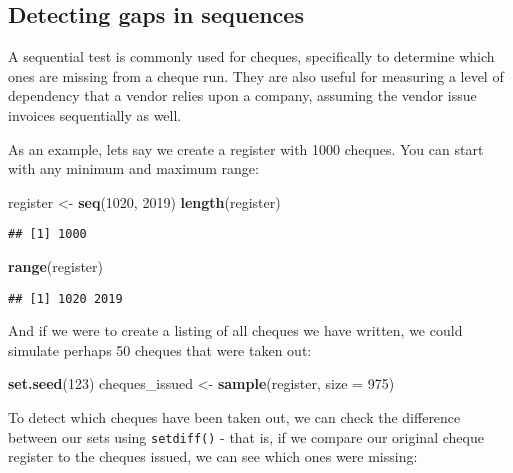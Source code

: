 \documentclass[
]{book}
\newenvironment{Shaded}{\begin{snugshade}}{\end{snugshade}}
\newcommand{\DataTypeTok}[1]{\textcolor[rgb]{0.13,0.29,0.53}{#1}}
\newcommand{\DecValTok}[1]{\textcolor[rgb]{0.00,0.00,0.81}{#1}}
\newcommand{\KeywordTok}[1]{\textcolor[rgb]{0.13,0.29,0.53}{\textbf{#1}}}
\newcommand{\NormalTok}[1]{#1}
\newcommand{\StringTok}[1]{\textcolor[rgb]{0.31,0.60,0.02}{#1}}
\begin{document}
\hypertarget{detecting-gaps-in-sequences}{%
\subsection{Detecting gaps in sequences}\label{detecting-gaps-in-sequences}}

A sequential test is commonly used for cheques, specifically to determine which ones are missing from a cheque run. They are also useful for measuring a level of dependency that a vendor relies upon a company, assuming the vendor issue invoices sequentially as well.

As an example, lets say we create a register with 1000 cheques. You can start with any minimum and maximum range:

\begin{Shaded}
\begin{Highlighting}[]
\NormalTok{register <-}\StringTok{ }\KeywordTok{seq}\NormalTok{(}\DecValTok{1020}\NormalTok{, }\DecValTok{2019}\NormalTok{)}
\KeywordTok{length}\NormalTok{(register)}
\end{Highlighting}
\end{Shaded}

\begin{verbatim}
## [1] 1000
\end{verbatim}

\begin{Shaded}
\begin{Highlighting}[]
\KeywordTok{range}\NormalTok{(register)}
\end{Highlighting}
\end{Shaded}

\begin{verbatim}
## [1] 1020 2019
\end{verbatim}

And if we were to create a listing of all cheques we have written, we could simulate perhaps 50 cheques that were taken out:

\begin{Shaded}
\begin{Highlighting}[]
\KeywordTok{set.seed}\NormalTok{(}\DecValTok{123}\NormalTok{)}
\NormalTok{cheques_issued <-}\StringTok{ }\KeywordTok{sample}\NormalTok{(register, }\DataTypeTok{size =} \DecValTok{975}\NormalTok{)}
\end{Highlighting}
\end{Shaded}

To detect which cheques have been taken out, we can check the difference between our sets using \texttt{setdiff()} - that is, if we compare our original cheque register to the cheques issued, we can see which ones were missing:
\end{document}

